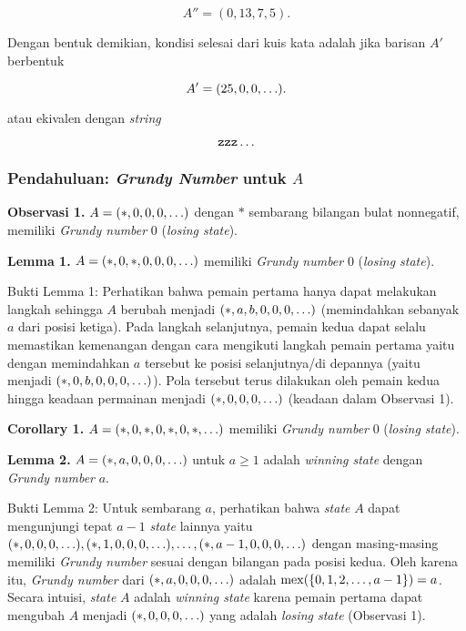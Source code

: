 \documentclass[../main_editorial.tex]{subfiles} %
\begin{document}
$$
A'' = (0, 13, 7, 5).
$$

Dengan bentuk demikian, kondisi selesai dari kuis kata adalah jika barisan $ A' $ berbentuk

$$
A' = (25, 0, 0, \mathellipsis).
$$

atau ekivalen dengan \textit{string}

$$
\mathtt{zzz}\mathellipsis
$$

\subsubsection*{Pendahuluan: \textit{\textbf{Grundy Number}} untuk $ \mathbf{\mathit{A}} $}

\textbf{Observasi 1.} $ A = (*, 0, 0, 0, \mathellipsis) $ dengan $ * $ sembarang bilangan bulat nonnegatif, memiliki \textit{Grundy number} 0 (\textit{losing state}).

\textbf{Lemma 1.} $ A = (*, 0, *, 0, 0, 0, \mathellipsis) $ memiliki \textit{Grundy number} 0 (\textit{losing state}).

Bukti Lemma 1: Perhatikan bahwa pemain pertama hanya dapat melakukan langkah sehingga $ A $ berubah menjadi $ (*, a, b, 0, 0, 0, \mathellipsis) $ (memindahkan sebanyak $ a $ dari posisi ketiga). Pada langkah selanjutnya, pemain kedua dapat selalu memastikan kemenangan dengan cara mengikuti langkah pemain pertama yaitu dengan memindahkan $ a $ tersebut ke posisi selanjutnya/di depannya (yaitu menjadi $ (*, 0, b, 0, 0, 0, \mathellipsis) $). Pola tersebut terus dilakukan oleh pemain kedua hingga keadaan permainan menjadi $ (*, 0, 0, 0, \mathellipsis) $ (keadaan dalam Observasi 1).

\textbf{Corollary 1.} $ A = (*, 0, *, 0, *, 0, *, \mathellipsis) $  memiliki \textit{Grundy number} 0 (\textit{losing state}).

\textbf{Lemma 2.} $ A = (*, a, 0, 0, 0, \mathellipsis) $ untuk $ a \ge 1 $ adalah \textit{winning state} dengan \textit{Grundy number} $ a $.

Bukti Lemma 2: Untuk sembarang $ a $, perhatikan bahwa \textit{state} $ A $ dapat mengunjungi tepat $ a - 1 $ \textit{state} lainnya yaitu $ (*, 0, 0, 0, \mathellipsis), (*, 1, 0, 0, 0, \mathellipsis), \mathellipsis, (*, a-1, 0, 0, 0, \mathellipsis) $ dengan masing-masing memiliki \textit{Grundy number} sesuai dengan bilangan pada posisi kedua. Oleh karena itu, \textit{Grundy number} dari $ (*, a, 0, 0, 0, \mathellipsis) $ adalah $ \mathrm{mex}(\{0, 1, 2, \mathellipsis, a - 1\}) = a $. Secara intuisi, \textit{state} $ A $ adalah \textit{winning state} karena pemain pertama dapat mengubah $ A $ menjadi $ (*, 0, 0, 0, \mathellipsis) $ yang adalah \textit{losing state} (Observasi 1).
\end{document}
